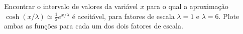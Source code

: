Encontrar o intervalo de valores da variável $x$ para o qual a aproximação $\cosh(x/\lambda) \simeq \frac{1}{2}e^{x/\lambda}$ é aceitável, para fatores de escala $\lambda = 1$ e $\lambda = 6$. Plote ambas as funções para cada um dos dois fatores de escala.

